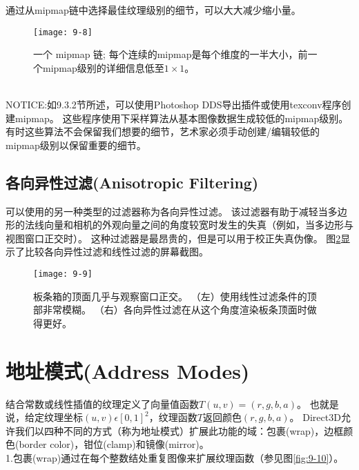 \begin{flushleft}
通过从mipmap链中选择最佳纹理级别的细节，可以大大减少缩小量。
\end{flushleft}

\begin{figure}[h]
    \texttt{[image: 9-8]}
    \centering
    \caption{一个 mipmap 链; 每个连续的mipmap是每个维度的一半大小，前一个mipmap级别的详细信息低至$1\times 1$。}
    \label{fig:9-8}
\end{figure}

\begin{flushleft}
~\\
NOTICE:如9.3.2节所述，可以使用Photoshop DDS导出插件或使用texconv程序创建mipmap。 这些程序使用下采样算法从基本图像数据生成较低的mipmap级别。 有时这些算法不会保留我们想要的细节，艺术家必须手动创建/编辑较低的mipmap级别以保留重要的细节。
~\\
\end{flushleft}

\subsection{各向异性过滤(Anisotropic Filtering)}
\begin{flushleft}
可以使用的另一种类型的过滤器称为各向异性过滤。 该过滤器有助于减轻当多边形的法线向量和相机的外观向量之间的角度较宽时发生的失真（例如，当多边形与视图窗口正交时）。 这种过滤器是最昂贵的，但是可以用于校正失真伪像。 图\ref{fig:9-9}显示了比较各向异性过滤和线性过滤的屏幕截图。
\end{flushleft}

\begin{figure}[h]
    \texttt{[image: 9-9]}
    \centering
    \caption{板条箱的顶面几乎与观察窗口正交。 （左）使用线性过滤条件的顶部非常模糊。 （右）各向异性过滤在从这个角度渲染板条顶面时做得更好。}
    \label{fig:9-9}
\end{figure}

\section{地址模式(Address Modes)}
\begin{flushleft}
结合常数或线性插值的纹理定义了向量值函数$T(u,v)=(r,g,b,a)$。 也就是说，给定纹理坐标$(u,v)\epsilon [0,1]^{2}$，纹理函数$T$返回颜色$(r,g,b,a)$。 Direct3D允许我们以四种不同的方式（称为地址模式）扩展此功能的域：包裹(wrap)，边框颜色(border color)，钳位(clamp)和镜像(mirror)。\\
1.包裹(wrap)通过在每个整数结处重复图像来扩展纹理函数（参见图\ref{fig:9-10}）。
\end{flushleft}


